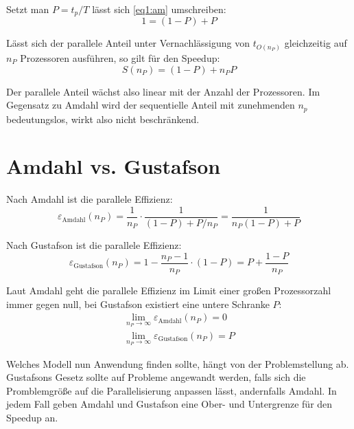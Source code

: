 		Setzt man $P=t_p/T$ lässt sich \ref{eq1:am} umschreiben:
		\begin{equation}
			1 = (1 - P) + P
		\end{equation}
		
		Lässt sich der parallele Anteil unter Vernachlässigung von $t_{O(n_P)}$ gleichzeitig auf $n_P$ Prozessoren ausführen, so gilt für den \Gls{Speedup}:
    		\begin{equation}
        		S(n_P) = (1 - P) + n_P P
    		\end{equation}
		
		Der parallele Anteil wächst also linear mit der Anzahl der Prozessoren. Im Gegensatz zu Amdahl wird der sequentielle Anteil mit zunehmenden $n_p$ bedeutungslos, wirkt also nicht beschränkend.
		 
		\section{Amdahl vs. Gustafson}		
		Nach Amdahl ist die \gls{parallele Effizienz}:
        	\begin{equation}
           	\varepsilon_{\text{Amdahl}}(n_P)    = \frac1{n_P}\cdot \frac1{(1-P)+P/n_P} = \frac1{n_P(1-P)+P}
        	\end{equation}
        	
        	Nach Gustafson ist die \gls{parallele Effizienz}:
		\begin{equation}
			\varepsilon_{\text{Gustafson}}(n_P) = 1 - \frac{n_P-1}{n_P}\cdot (1-P) = P +\frac{1-P}{n_P}
		\end{equation}
		
		Laut Amdahl geht die \gls{parallele Effizienz} im Limit einer großen Prozessorzahl immer gegen null, bei Gustafson existiert eine untere Schranke $P$:
		\begin{gather*}
			\lim\limits_{n_P \rightarrow \infty}\varepsilon_{\text{Amdahl}}(n_P)    = 0 \\        
			\lim\limits_{n_P \rightarrow \infty}\varepsilon_{\text{Gustafson}}(n_P) = P
		\end{gather*}
		
		Welches Modell nun Anwendung finden sollte, hängt von der Problemstellung ab. Gustafsons Gesetz sollte auf Probleme angewandt werden, falls sich die Promblemgrö\ss e auf die Parallelisierung anpassen lässt, andernfalls Amdahl. In jedem Fall geben Amdahl und Gustafson eine Ober- und Untergrenze für den \Gls{Speedup} an. 

		\newpage
